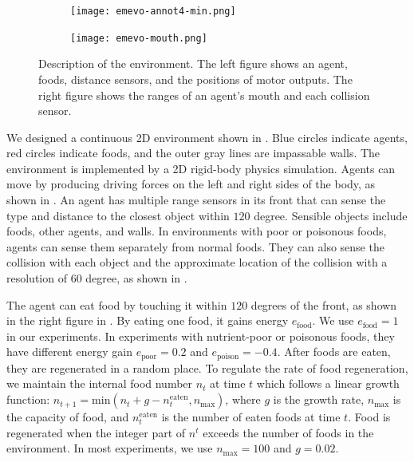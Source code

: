 \begin{figure}[t]
  \begin{subfigure}[t]{4.5cm}
    \centering
    \texttt{[image: emevo-annot4-min.png]}
  \end{subfigure}
  \begin{subfigure}[t]{3.5cm}
    \centering
    \texttt{[image: emevo-mouth.png]}
  \end{subfigure}
  \caption{
    Description of the environment.
    The left figure shows an agent, foods, distance sensors, and the positions of motor outputs.
    The right figure shows the ranges of an agent's mouth and each collision sensor.
  }\label{figure:env-discr}
\end{figure}

We designed a continuous 2D environment shown in . Blue circles indicate agents, red circles indicate foods, and the outer gray lines are impassable walls. The environment is implemented by a 2D rigid-body physics simulation. Agents can move by producing driving forces on the left and right sides of the body, as shown in . An agent has multiple range sensors in its front that can sense the type and distance to the closest object within $120$ degree. Sensible objects include foods, other agents, and walls. In environments with poor or poisonous foods, agents can sense them separately from normal foods. They can also sense the collision with each object and the approximate location of the collision with a resolution of $60$ degree, as shown in .

The agent can eat food by touching it within $120$ degrees of the front, as shown in the right figure in . By eating one food, it gains energy $e_{\mathrm{food}}$. We use $e_{\mathrm{food}} = 1$ in our experiments. In experiments with nutrient-poor or poisonous foods, they have different energy gain $e_{\mathrm{poor}} = 0.2$ and $e_{\mathrm{poison}} = -0.4$. After foods are eaten, they are regenerated in a random place. To regulate the rate of food regeneration, we maintain the internal food number $n_{t}$ at time $t$ which follows a linear growth function: $n_{t + 1} = \textrm{min}(n_{t} + g - n_{t}^{\mathrm{eaten}}, n_{\mathrm{max}})$, where $g$ is the growth rate, $n_{\mathrm{max}}$ is the capacity of food, and $n_{t}^{\mathrm{eaten}}$ is the number of eaten foods at time $t$. Food is regenerated when the integer part of $n^{t}$ exceeds the number of foods in the environment. In most experiments, we use $n_{\mathrm{max}} = 100$ and $g = 0.02$.

